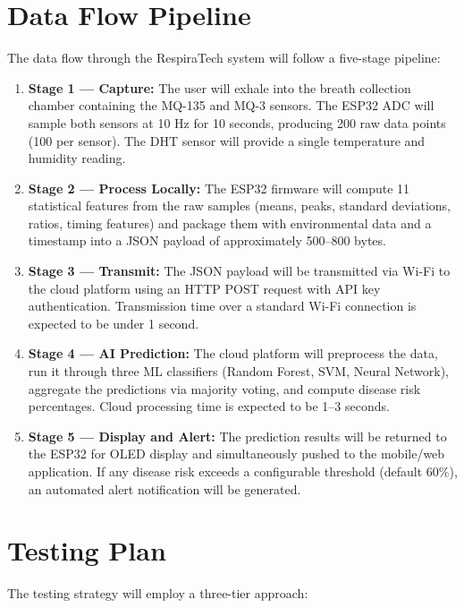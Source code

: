 \section{Data Flow Pipeline}
The data flow through the RespiraTech system will follow a five-stage pipeline:

\begin{enumerate}[leftmargin=1.5cm]
\item \textbf{Stage 1 --- Capture:} The user will exhale into the breath collection chamber containing the MQ-135 and MQ-3 sensors. The ESP32 ADC will sample both sensors at 10 Hz for 10 seconds, producing 200 raw data points (100 per sensor). The DHT sensor will provide a single temperature and humidity reading.

\item \textbf{Stage 2 --- Process Locally:} The ESP32 firmware will compute 11 statistical features from the raw samples (means, peaks, standard deviations, ratios, timing features) and package them with environmental data and a timestamp into a JSON payload of approximately 500--800 bytes.

\item \textbf{Stage 3 --- Transmit:} The JSON payload will be transmitted via Wi-Fi to the cloud platform using an HTTP POST request with API key authentication. Transmission time over a standard Wi-Fi connection is expected to be under 1 second.

\item \textbf{Stage 4 --- AI Prediction:} The cloud platform will preprocess the data, run it through three ML classifiers (Random Forest, SVM, Neural Network), aggregate the predictions via majority voting, and compute disease risk percentages. Cloud processing time is expected to be 1--3 seconds.

\item \textbf{Stage 5 --- Display and Alert:} The prediction results will be returned to the ESP32 for OLED display and simultaneously pushed to the mobile/web application. If any disease risk exceeds a configurable threshold (default 60\%), an automated alert notification will be generated.
\end{enumerate}

\section{Testing Plan}
The testing strategy will employ a three-tier approach:

